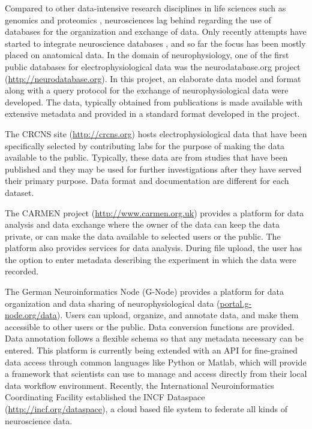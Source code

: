 \documentclass{frontiersSCNS} %
\begin{document}
Compared to other data-intensive research disciplines in life sciences such as
genomics and proteomics \citep{Gelbart1997, Stoesser1997, DeSchutter2008},
neurosciences lag behind regarding the use of databases for the organization
and exchange of data. Only recently attempts have started to integrate
neuroscience databases \citep{Amari2002, Gupta2008}, and so far the focus has
been mostly placed on anatomical data. In the domain of neurophysiology, one of
the first public databases for electrophysiological data was the
neurodatabase.org project (\url{http://neurodatabase.org}). In this project, an
elaborate data model and format along with a query protocol for the exchange of
neurophysiological data were developed. The data, typically obtained from
publications is made available with extensive metadata and provided in a
standard format developed in the project.

The CRCNS site (\url{http://crcns.org}) hosts electrophysiological data that have been
specifically selected by contributing labs for the purpose of making the data
available to the public. Typically, these data are from studies that have been
published and they may be used for further investigations after they have
served their primary purpose. Data format and documentation are different for
each dataset.

The CARMEN project (\url{http://www.carmen.org.uk}) provides a platform for data analysis
and data exchange where the owner of the data can keep the data private, or can
make the data available to selected users or the public. The platform also
provides services for data analysis. During file upload, the user has the
option to enter metadata describing the experiment in which the data were
recorded. 

The German Neuroinformatics Node (G-Node) provides a platform for data
organization and data sharing of neurophysiological data
(\url{portal.g-node.org/data}). Users can upload, organize, and annotate data, and
make them accessible to other users or the public. Data conversion functions
are provided. Data annotation follows a flexible schema \citep{Grewe2011} so
that any metadata necessary can be entered. This platform is currently being
extended with an API for fine-grained data access through common languages like
Python or Matlab, which will provide a framework that scientists can use to
manage and access directly from their local data workflow environment.
Recently, the International Neuroinformatics Coordinating Facility established
the INCF Dataspace (\url{http://incf.org/dataspace}), a cloud based file system to federate
all kinds of neuroscience data.
\end{document}
